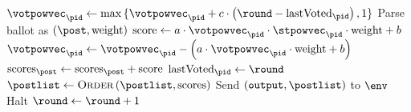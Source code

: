 \begin{algorithm}[H]
  \caption{$\textsc{HandleVote}\left(\mathrm{ballot},
  \player_{\pid}\right)$}
  \label{alg:steem:handlevote}
  \begin{algorithmic}[1]
     
      \State $\votpowvec_{\pid} \gets \max{\lbrace \votpowvec_{\pid} + c
      \cdot \left(\round - \mathrm{lastVoted}_{\pid}\right), 1 \rbrace}$
        \State Parse ballot as $\left(\post, \mathrm{weight}\right)$
        \State $\mathrm{score} \gets a \cdot \votpowvec_{\pid} \cdot
        \stpowvec_{\pid} \cdot \mathrm{weight} + b$
        \State $\votpowvec_{\pid} \gets \votpowvec_{\pid} - \left(a \cdot
        \votpowvec_{\pid} \cdot \mathrm{weight} + b\right)$
        \State $\mathrm{scores}_\post \gets \mathrm{scores}_\post +
        \mathrm{score}$
      \EndIf
      \State $\mathrm{lastVoted}_{\pid} \gets \round$
    \EndIf
      \State $\postlist \gets \textsc{Order}\left(\postlist,
      \mathrm{scores}\right)$ 
      \If{$\round = \rounds$}
        \State Send $\left(\mathtt{output}, \postlist\right)$ to $\env$
        \State Halt
      \Else
        \State $\round \gets \round + 1$
      \EndIf
    \EndIf
  \end{algorithmic}
\end{algorithm}
